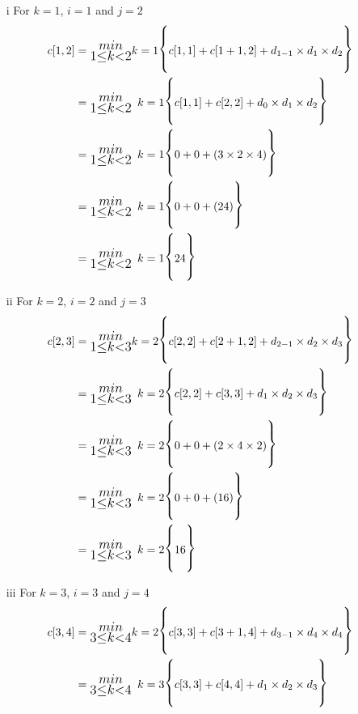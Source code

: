 \documentclass[12pt]{report}
\begin{document}
	\begin{enumerate}
		\item[i] For $k=1$, $i = 1$ and $j = 2$
		\begin{align*}
			c[1,2] &= \LARGE\substack{min\\1\le k < 2} k = 1 \bigg\{ c[1,1] + c[1+1,2] + d_{1-1} \times d_1\times d_2\bigg\}\\
			&=\LARGE\substack{min\\1\le k < 2}~ k = 1 \bigg\{ c[1,1] + c[2,2] + d_{0} \times d_1\times d_2\bigg\}\\
			& = \LARGE\substack{min\\1\le k < 2}~ k = 1 \bigg\{ 0 + 0 + (3 \times 2\times 4)\bigg\}\\
			& = \LARGE\substack{min\\1\le k < 2}~ k = 1 \bigg\{ 0 + 0 + (24)\bigg\}\\
			& = \LARGE\substack{min\\1\le k < 2}~ k = 1 \bigg\{24\bigg\}
		\end{align*}
		\item[ii] For $k=2$, $i = 2$ and $j = 3$
		\begin{align*}
			c[2,3] &= \LARGE\substack{min\\1\le k < 3} k = 2 \bigg\{ c[2,2] + c[2+1,2] + d_{2-1} \times d_2\times d_3\bigg\}\\
			&=\LARGE\substack{min\\1\le k < 3}~ k = 2 \bigg\{ c[2,2] + c[3,3] + d_{1} \times d_2\times d_3\bigg\}\\
			& = \LARGE\substack{min\\1\le k < 3}~ k = 2 \bigg\{ 0 + 0 + (2 \times 4\times 2)\bigg\}\\
			& = \LARGE\substack{min\\1\le k < 3}~ k = 2 \bigg\{ 0 + 0 + (16)\bigg\}\\
			& = \LARGE\substack{min\\1\le k < 3}~ k = 2 \bigg\{16\bigg\}
		\end{align*}
		\item[iii] For $k=3$, $i = 3$ and $j = 4$
		\begin{align*}
			c[3,4] &= \LARGE\substack{min\\3\le k < 4} k = 2 \bigg\{ c[3,3] + c[3+1,4] + d_{3-1} \times d_4\times d_4\bigg\}\\
			&=\LARGE\substack{min\\3\le k < 4}~ k = 3 \bigg\{ c[3,3] + c[4,4] + d_{1} \times d_2\times d_3\bigg\}\\

\end{align*}
\end{enumerate}
\end{document}
